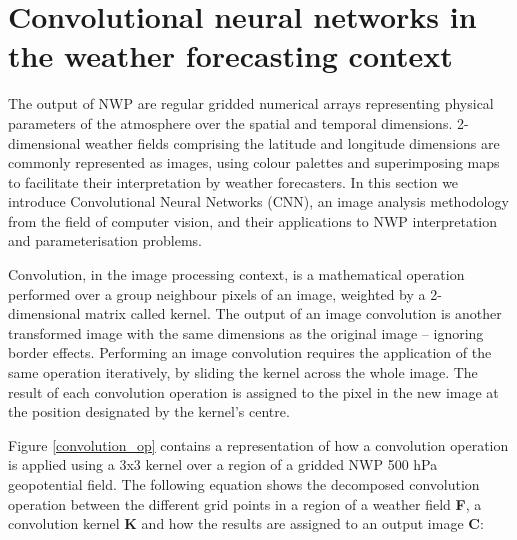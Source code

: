 \documentclass[twocol]{ametsoc}
\begin{document}

\section{Convolutional neural networks in the weather forecasting context}

The output of NWP are regular gridded numerical arrays representing physical parameters of the atmosphere over the spatial and temporal dimensions. 2-dimensional weather fields comprising the latitude and longitude dimensions are commonly represented as images, using colour palettes and superimposing maps to facilitate their interpretation by weather forecasters. In this section we introduce Convolutional Neural Networks (CNN), an image analysis methodology from the field of computer vision, and their applications to NWP interpretation and parameterisation problems.

Convolution, in the image processing context, is a mathematical operation performed over a group neighbour pixels of an image, weighted by a 2-dimensional matrix called kernel. The output of an image convolution is another transformed image with the same dimensions as the original image -- ignoring border effects. Performing an image convolution requires the application of the same operation iteratively, by sliding the kernel across the whole image. The result of each convolution operation is assigned to the pixel in the new image at the position designated by the kernel's centre.

Figure \ref{convolution_op} contains a representation of how a convolution operation is applied using a 3x3 kernel over a region of a gridded NWP 500 hPa geopotential field. The following equation shows the decomposed convolution operation between the different grid points in a region of a weather field \textbf{F}, a convolution kernel \textbf{K} and how the results are assigned to an output image \textbf{C}: 
\end{document}
